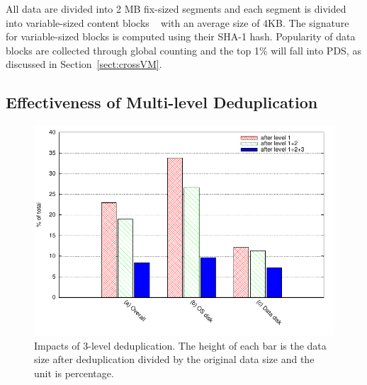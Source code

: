 All data are divided into 2 MB fix-sized segments and each segment is divided into 
variable-sized content blocks ~\cite{similar94,rabin81} with an average size of 4KB.
The signature for variable-sized blocks is computed using their SHA-1 hash. 
Popularity of data blocks are collected through global counting 
and the top 1\% will fall into PDS, as discussed in Section~\ref{sect:crossVM}.



\subsection{Effectiveness of Multi-level Deduplication}

\begin{figure}
  \centering
  \includegraphics[width=5in]{images/overall_effect.pdf}
  \caption{Impacts of 3-level deduplication. The height of each bar is the data size after 
deduplication divided by the original data size and the unit is percentage. }
  \label{fig:overall}
\end{figure}

